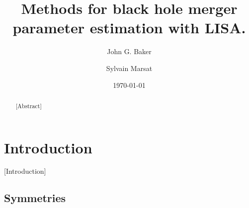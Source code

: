\documentclass[aps,showpacs,twocolumn,prd,superscriptaddress,nofootinbib]{revtex4}
\begin{document}
\title{Methods for black hole merger parameter estimation with LISA.}

\author{John G. Baker}
\author{Sylvain Marsat}



\date{\today}

\begin{abstract}

[Abstract]

\end{abstract}


\maketitle


\section{Introduction}
\label{sec:intro}

[Introduction]


\subsection{Symmetries}
\end{document}
